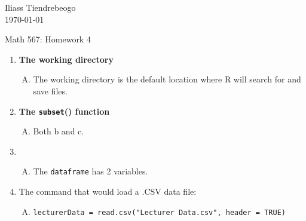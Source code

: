 \documentclass{article}[12pt]
\begin{document}
\hfill Iliass Tiendrebeogo\\

\hfill \today\\

\bigskip

\begin{center}
  \begin{Large}
    Math 567: Homework 4 \\
    
   
  \end{Large}
\end{center} 


\begin{enumerate}[1.]
\item  %
{\bf The working directory }
 \begin{enumerate}[A.]
 \item 
The working directory is the default location where R will search for and save files.
\end{enumerate}
\item %
{\bf The \texttt{subset}() function }
 \begin{enumerate}[D.]
 \item 
  Both b and c.
  \end{enumerate}

\item %

 \begin{enumerate}[C.]
 \item 
  The \texttt{dataframe} has 2 variables.
  \end{enumerate}

\item %
The command that would load a .CSV data file:
 \begin{enumerate}[B.]
 \item 
  \texttt{lecturerData = read.csv("Lecturer Data.csv", header = TRUE) }
  \end{enumerate}

\end{enumerate}
\end{document}
